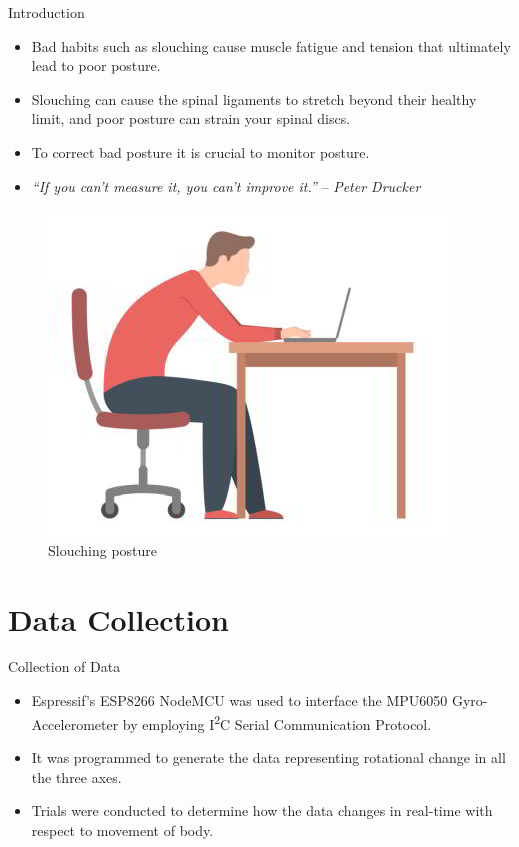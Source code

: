 \documentclass[aspectratio=169,xcolor=dvipsnames]{beamer}
\begin{document}
\begin{frame}{Introduction}
        \vspace{0.5cm}
        \begin{itemize}
        \item Bad habits such as slouching cause muscle fatigue and tension
            that ultimately lead to poor posture.
        \item Slouching can cause the spinal ligaments to stretch beyond their
            healthy limit, and poor posture can strain your spinal discs.
        \item To correct bad posture it is crucial to monitor posture.
        \item \textit{``If you can’t measure it, you can’t improve it.''}
            –\textit{ Peter Drucker}
    \end{itemize}
    \hfill
     \begin{figure}
        \centering
        \includegraphics[scale=0.25]{slouching_bad_posture.jpg}
        \caption{Slouching posture}
        \label{fig:good}
    \end{figure}
\end{frame}

\section{Data Collection}

\begin{frame}{Collection of Data}
    \begin{itemize}
        \item Espressif's ESP8266 NodeMCU was used to interface the MPU6050
            Gyro-Accelerometer by employing I\textsuperscript{2}C Serial Communication Protocol.
        \item It was programmed to generate the data representing rotational
            change in all the three axes.
        \item Trials were conducted to determine how the data changes in
            real-time with respect to movement of body.
    \end{itemize}

\end{frame}
\end{document}
